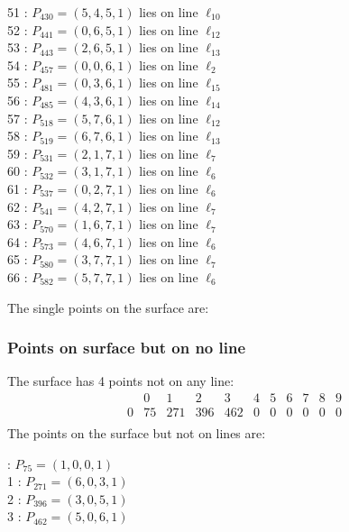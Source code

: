 \documentclass{article}
\begin{document}
{\begin{multicols}{2}
51 : $P_{430}=( 5, 4, 5, 1 )$ lies on line $\ell_{10}$\\
52 : $P_{441}=( 0, 6, 5, 1 )$ lies on line $\ell_{12}$\\
53 : $P_{443}=( 2, 6, 5, 1 )$ lies on line $\ell_{13}$\\
54 : $P_{457}=( 0, 0, 6, 1 )$ lies on line $\ell_{2}$\\
55 : $P_{481}=( 0, 3, 6, 1 )$ lies on line $\ell_{15}$\\
56 : $P_{485}=( 4, 3, 6, 1 )$ lies on line $\ell_{14}$\\
57 : $P_{518}=( 5, 7, 6, 1 )$ lies on line $\ell_{12}$\\
58 : $P_{519}=( 6, 7, 6, 1 )$ lies on line $\ell_{13}$\\
59 : $P_{531}=( 2, 1, 7, 1 )$ lies on line $\ell_{7}$\\
60 : $P_{532}=( 3, 1, 7, 1 )$ lies on line $\ell_{6}$\\
61 : $P_{537}=( 0, 2, 7, 1 )$ lies on line $\ell_{6}$\\
62 : $P_{541}=( 4, 2, 7, 1 )$ lies on line $\ell_{7}$\\
63 : $P_{570}=( 1, 6, 7, 1 )$ lies on line $\ell_{7}$\\
64 : $P_{573}=( 4, 6, 7, 1 )$ lies on line $\ell_{6}$\\
65 : $P_{580}=( 3, 7, 7, 1 )$ lies on line $\ell_{7}$\\
66 : $P_{582}=( 5, 7, 7, 1 )$ lies on line $\ell_{6}$\\
\end{multicols}
The single points on the surface are:\\
\subsubsection*{Points on surface but on no line}
The surface has 4 points not on any line:\\
$$
\begin{array}{r|*{10}{r}}
 & 0 & 1 & 2 & 3 & 4 & 5 & 6 & 7 & 8 & 9\\
\hline
0 & 75 & 271 & 396 & 462 & 0 & 0 & 0 & 0 & 0 & 0\\
\end{array}
$$
The points on the surface but not on lines are:\\
\begin{multicols}{2}
 : $P_{75}=( 1, 0, 0, 1 )$\\
1 : $P_{271}=( 6, 0, 3, 1 )$\\
2 : $P_{396}=( 3, 0, 5, 1 )$\\
3 : $P_{462}=( 5, 0, 6, 1 )$\\
\end{multicols}
}
\end{document}
